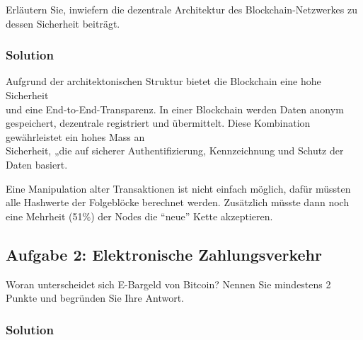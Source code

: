 \documentclass[11pt]{article}
\begin{document}
Erläutern Sie, inwiefern die dezentrale Architektur des
Blockchain-Netzwerkes zu dessen Sicherheit beiträgt.

\hypertarget{solution}{%
\subsubsection{Solution}\label{solution}}

Aufgrund der architektonischen Struktur bietet die Blockchain eine hohe
Sicherheit\\
und eine End-to-End-Transparenz. In einer Blockchain werden Daten anonym
gespeichert, dezentrale registriert und übermittelt. Diese Kombination
gewährleistet ein hohes Mass an\\
Sicherheit, „die auf sicherer Authentifizierung, Kennzeichnung und
Schutz der Daten basiert.

Eine Manipulation alter Transaktionen ist nicht einfach möglich, dafür
müssten alle Hashwerte der Folgeblöcke berechnet werden. Zusätzlich
müsste dann noch eine Mehrheit (51\%) der Nodes die ``neue'' Kette
akzeptieren.

    \hypertarget{aufgabe-2-elektronische-zahlungsverkehr}{%
\subsection{Aufgabe 2: Elektronische
Zahlungsverkehr}\label{aufgabe-2-elektronische-zahlungsverkehr}}

Woran unterscheidet sich E-Bargeld von Bitcoin? Nennen Sie mindestens 2
Punkte und begründen Sie Ihre Antwort.

\hypertarget{solution}{%
\subsubsection{Solution}\label{solution}}
\end{document}
